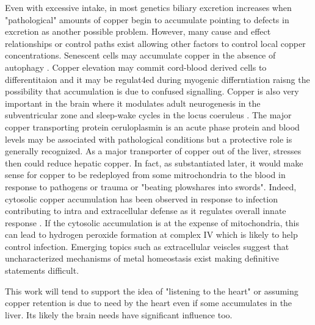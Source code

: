 {Even with excessive intake, in most genetics
 biliary excretion increases when "pathological"
amounts of copper begin to accumulate
\cite{Chen_Min_Wang_Copper_homeostasis_cuproptosis_2022}
\cite{Hamza_Gitlin_Hepatic_Copper_Transport_2013} pointing
to defects in excretion as another possible problem.
However, many cause and effect relationships or
control paths exist allowing other factors to control
local copper concentrations.  
Senescent cells may accumulate copper in the absence
of autophagy
\cite{Masaldan_Clatworthy_Gamell_Copper_accumulation_senescent_2018}.
Copper elevation may commit 
cord-blood derived cells  to differentitaion \cite{PMID11849228}
and it may be regulat4ed during myogenic differntiation
\cite{PMC5824686} raisng the possibility that accumulation
is due to confused signalling. 
Copper is also very important in the brain
\cite{Gale_Aizenman_physiological_pathophysiological_2024}
 where
it modulates adult neurogenesis in the subventricular zone
\cite{PMC9456150}
and sleep-wake cycles in the locus coeruleus \cite{PMC6008210}.
The major copper transporting protein ceruloplasmin is an 
acute phase protein 
and blood levels may be associated with pathological conditions
\cite{PMID15668644} but a protective role is generally recognized.
As a major transporter of copper out of the liver, 
stresses then could reduce hepatic  copper.
In fact, as substantiated later, it would make sense
for copper to be redeployed from some mitrochondria to the blood
in response to pathogens or trauma or "beating plowshares into swords".
Indeed, cytosolic copper accumulation has been observed in
response to infection contributing to intra and extracellular
defense as it regulates overall innate response
\cite{Lu_Liu_Li_Copper_regulates_host_2024}.
If the cytosolic accumulation is at the expense of
mitochondria, this can  lead to hydrogen
peroxide formation at complex IV  
which is likely to help  control infection. 
Emerging topics  such as extracellular veiscles 
\cite{Bellingham_Guo_Hill_secret_life_2015} suggest
that uncharacterized mechanisms of metal homeostasis
exist making definitive statements difficult.

This work will tend to support the idea of "listening to the heart"
or assuming copper retention is due to need by the heart 
even if some accumulates in the liver. Its likely the brain needs
have significant influence too. 




}
